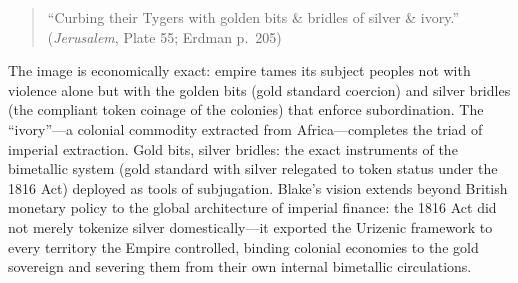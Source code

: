 \documentclass[
]{article}
\begin{document}
\begin{quote}
``Curbing their Tygers with golden bits \& bridles of silver \& ivory.''
(\emph{Jerusalem}, Plate 55; Erdman p.~205) \citep{erdman1988complete}
\end{quote}

The image is economically exact: empire tames its subject peoples not
with violence alone but with the golden bits (gold standard coercion)
and silver bridles (the compliant token coinage of the colonies) that
enforce subordination. The ``ivory''---a colonial commodity extracted
from Africa---completes the triad of imperial extraction. Gold bits,
silver bridles: the exact instruments of the bimetallic system (gold
standard with silver relegated to token status under the 1816 Act)
deployed as tools of subjugation. Blake's vision extends beyond British
monetary policy to the global architecture of imperial finance: the 1816
Act did not merely tokenize silver domestically---it exported the
Urizenic framework to every territory the Empire controlled, binding
colonial economies to the gold sovereign and severing them from their
own internal bimetallic circulations.
\end{document}
